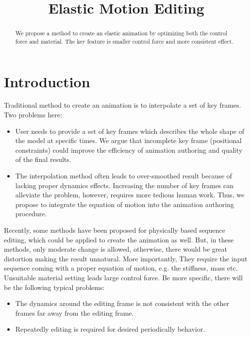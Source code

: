 \documentclass[9pt,twocolumn]{extarticle}
\title{Elastic Motion Editing}
\begin{document}
\maketitle

\setlength{\parskip}{0.5ex}

\begin{abstract}
  We propose a method to create an elastic animation by optimizing
  both the control force and material.  The key feature is smaller
  control force and more consistent effect.
\end{abstract}

\section{Introduction}

Traditional method to create an animation is to interpolate a set of
key frames.  Two problems here:
\begin{itemize}
\item User needs to provide a set of key frames which describes the
  whole shape of the model at specific times.  We argue that
  incomplete key frame (positional constraints) could improve the
  efficiency of animation authoring and quality of the final results.
\item The interpolation method often leads to over-smoothed result
  because of lacking proper dynamics effects.  Increasing the number
  of key frames can alleviate the problem, however, requires more
  tedious human work.  Thus, we propose to integrate the equation of
  motion into the animation authoring procedure.
\end{itemize}

Recently, some methods have been proposed for physically based
sequence editing, which could be applied to create the animation as
well.  But, in these methods, only moderate change is allowed,
otherwise, there would be great distortion making the result
unnatural.  More importantly, They require the input sequence coming
with a proper equation of motion, e.g. the stiffness, mass etc.
Unsuitable material setting leads large control force.  Be more
specific, there will be the following typical problems:
\begin{itemize}
\item The dynamics around the editing frame is not consistent with the
  other frames far away from the editing frame.
\item Repeatedly editing is required for desired periodically
  behavior.
\end{itemize}
\end{document}
